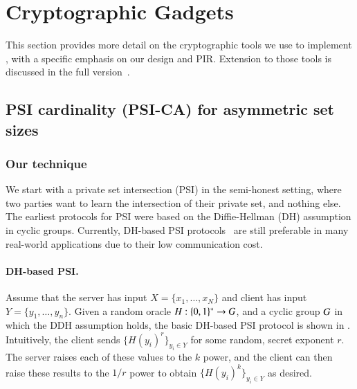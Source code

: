 \section{Cryptographic Gadgets}
\label{sect:psi_prot}

This section provides more detail on the cryptographic tools we use to implement \dect, with a specific emphasis on our \psica design and PIR. Extension to those tools is discussed in the full version~\cite{epione}.

\subsection{PSI cardinality (PSI-CA) for asymmetric set sizes}
\label{subs:psica}


\subsubsection{Our technique}

We start with a private set intersection (PSI) in the semi-honest setting, where two parties want to learn the intersection of their private set, and nothing else. The earliest protocols for PSI were based on the Diffie-Hellman (DH) assumption in cyclic groups. Currently, DH-based PSI protocols~\cite{Huberman99} are still preferable in many real-world applications due to their low communication cost. 


\paragraph{DH-based PSI.}
Assume that the server has input $X = \{x_1, \ldots, x_{N}\}$ and client has input $Y = \{ y_1, \ldots, y_{n} \}$.  Given a random oracle $H : \{0,1\}^* \rightarrow G$, and a cyclic group $G$  in which the DDH assumption holds, the basic DH-based PSI protocol is shown in . Intuitively, the client sends $\{ H(y_i)^r \}_{y_i \in Y}$ for some random, secret exponent $r$. The server raises each of these values to the $k$ power, and the client can then raise these results to the $1/r$ power to obtain $\{ H(y_i)^k \}_{y_i \in Y}$ as desired.

